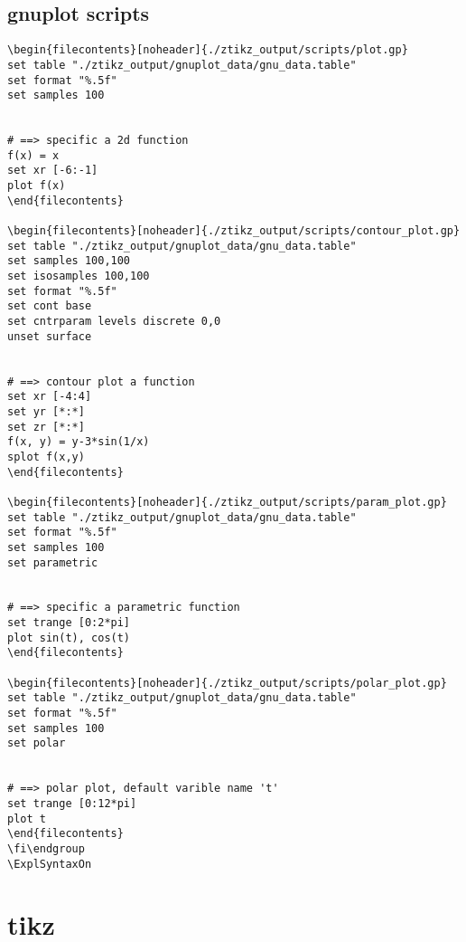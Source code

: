 \subsection{gnuplot scripts}
\begin{verbatim}
\begin{filecontents}[noheader]{./ztikz_output/scripts/plot.gp}
set table "./ztikz_output/gnuplot_data/gnu_data.table"
set format "%.5f"
set samples 100


# ==> specific a 2d function
f(x) = x
set xr [-6:-1]
plot f(x)
\end{filecontents}

\begin{filecontents}[noheader]{./ztikz_output/scripts/contour_plot.gp}
set table "./ztikz_output/gnuplot_data/gnu_data.table"
set samples 100,100
set isosamples 100,100
set format "%.5f"
set cont base
set cntrparam levels discrete 0,0
unset surface


# ==> contour plot a function
set xr [-4:4]
set yr [*:*]
set zr [*:*]
f(x, y) = y-3*sin(1/x)
splot f(x,y)
\end{filecontents}

\begin{filecontents}[noheader]{./ztikz_output/scripts/param_plot.gp}
set table "./ztikz_output/gnuplot_data/gnu_data.table"
set format "%.5f"
set samples 100
set parametric


# ==> specific a parametric function
set trange [0:2*pi]
plot sin(t), cos(t)  
\end{filecontents}

\begin{filecontents}[noheader]{./ztikz_output/scripts/polar_plot.gp}
set table "./ztikz_output/gnuplot_data/gnu_data.table"
set format "%.5f"
set samples 100
set polar


# ==> polar plot, default varible name 't'
set trange [0:12*pi]
plot t
\end{filecontents}
\fi\endgroup
\ExplSyntaxOn
\end{verbatim}

\section{tikz}
